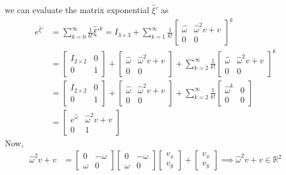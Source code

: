 we can evaluate the matrix exponential \( \hat \xi' \) as
\begin{align*}
    e^{\hat \xi'}
     & =
    \sum_{k=0}^{\infty} \frac{1}{k!} \hat \xi'^k
    =
    I_{3\times 3} + \sum_{k=1}^{\infty} \frac{1}{k!}
    \begin{bmatrix}
        \hat \omega & \hat \omega^2 v + v \\
        0           & 0
    \end{bmatrix}
    ^k
    \\ & =
    \begin{bmatrix}
        I_{2\times 2} & 0 \\
        0             & 1
    \end{bmatrix}
    +
    \begin{bmatrix}
        \hat \omega & \hat \omega^2 v + v \\
        0           & 0
    \end{bmatrix}
    +
    \sum_{k=2}^{\infty} \frac{1}{k!}
    \begin{bmatrix}
        \hat \omega & \hat \omega^2 v + v \\
        0           & 0
    \end{bmatrix}
    ^k
    \\ & =
    \begin{bmatrix}
        I_{2\times 2} & 0 \\
        0             & 1
    \end{bmatrix}
    +
    \begin{bmatrix}
        \hat \omega & \hat \omega^2 v + v \\
        0           & 0
    \end{bmatrix}
    +
    \sum_{k=2}^{\infty} \frac{1}{k!}
    \begin{bmatrix}
        \hat \omega ^k & 0 \\
        0              & 0
    \end{bmatrix}
    \\ & =
    \begin{bmatrix}
        e^{\hat \omega} & \hat \omega^2 v + v \\
        0               & 1
    \end{bmatrix}
\end{align*}
Now,
\begin{align*}
    \hat \omega^2 v + v
     & =
    \begin{bmatrix}
        0      & -\omega \\
        \omega & 0
    \end{bmatrix}
    \begin{bmatrix}
        0      & -\omega \\
        \omega & 0
    \end{bmatrix}
    \begin{bmatrix}
        v_x \\
        v_y
    \end{bmatrix}
    +
    \begin{bmatrix}
        v_x \\
        v_y
    \end{bmatrix}
    \implies
    \hat \omega^2 v + v \in \mathbb{R}^2
\end{align*}
